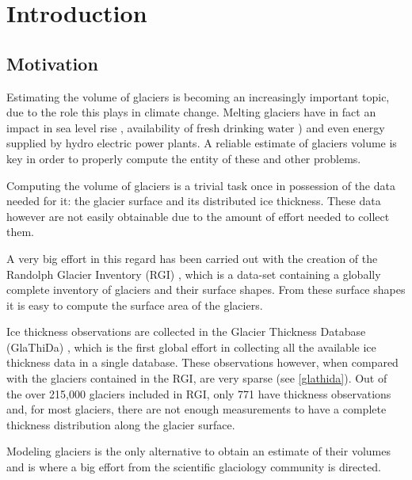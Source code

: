 \chapter{Introduction}\label{chap1}
\thispagestyle{plain}

\section{Motivation}\label{motivation}
Estimating the volume of glaciers is becoming an increasingly important topic, due to the role this plays in climate change. Melting glaciers have in fact an impact in sea level rise \citep{Zemp2017}, availability of fresh drinking water \citep{Kaser2010}) and even energy supplied by hydro electric power plants\citep{Terrier2011}. A reliable estimate of glaciers volume is key in order to properly compute the entity of these and other problems.

Computing the volume of glaciers is a trivial task once in possession of the data needed for it: the glacier surface and its distributed ice thickness. These data however are not easily obtainable due to the amount of effort needed to collect them.

A very big effort in this regard has been carried out with the creation of the Randolph Glacier Inventory (RGI) \citep{RGI2014}, which is a data-set containing a globally complete inventory of glaciers and their surface shapes. From these surface shapes it is easy to compute the surface area of the glaciers.

Ice thickness observations are collected in the Glacier Thickness Database (GlaThiDa) \citep{GlaThiDa2014}, which is the first global effort in collecting all the available ice thickness data in a single database. These observations however, when compared with the glaciers contained in the RGI, are very sparse (see \ref{glathida}). Out of the over 215,000 glaciers included in RGI, only 771 have thickness observations and, for most glaciers, there are not enough measurements to have a complete thickness distribution along the glacier surface. 

Modeling glaciers is the only alternative to obtain an estimate of their volumes and is where a big effort from the scientific glaciology community is directed.
  



